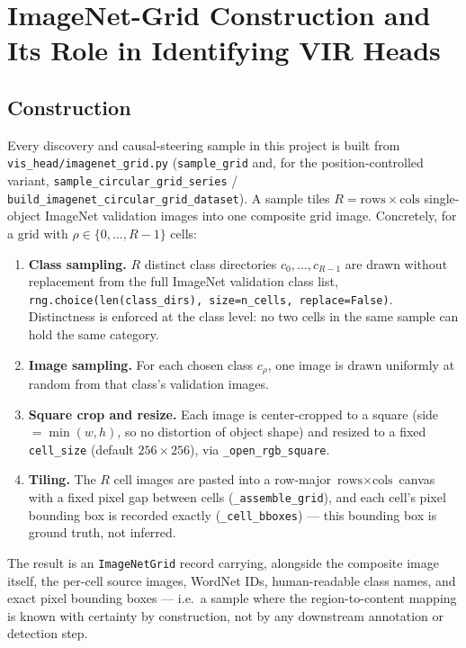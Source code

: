 \section{ImageNet-Grid Construction and Its Role in Identifying VIR Heads}
\label{sec:imagenet-grid}

\subsection{Construction}

Every discovery and causal-steering sample in this project is built from
\texttt{vis\_head/imagenet\_grid.py} (\texttt{sample\_grid} and, for the
position-controlled variant, \texttt{sample\_circular\_grid\_series} /
\texttt{build\_imagenet\_circular\_grid\_dataset}). A sample tiles
$R = \text{rows}\times\text{cols}$ single-object ImageNet validation images
into one composite grid image. Concretely, for a grid with $\rho \in
\{0,\dots,R-1\}$ cells:

\begin{enumerate}
  \item \textbf{Class sampling.} $R$ distinct class directories
  $c_0,\dots,c_{R-1}$ are drawn without replacement from the full ImageNet
  validation class list, \texttt{rng.choice(len(class\_dirs), size=n\_cells,
  replace=False)}. Distinctness is enforced at the class level: no two cells
  in the same sample can hold the same category.
  \item \textbf{Image sampling.} For each chosen class $c_\rho$, one image is
  drawn uniformly at random from that class's validation images.
  \item \textbf{Square crop and resize.} Each image is center-cropped to a
  square (side $=\min(w,h)$, so no distortion of object shape) and resized to
  a fixed \texttt{cell\_size} (default $256\times256$), via
  \texttt{\_open\_rgb\_square}.
  \item \textbf{Tiling.} The $R$ cell images are pasted into a row-major
  $\text{rows}\times\text{cols}$ canvas with a fixed pixel gap between cells
  (\texttt{\_assemble\_grid}), and each cell's pixel bounding box is recorded
  exactly (\texttt{\_cell\_bboxes}) — this bounding box is ground truth, not
  inferred.
\end{enumerate}

The result is an \texttt{ImageNetGrid} record carrying, alongside the
composite image itself, the per-cell source images, WordNet IDs, human-readable
class names, and exact pixel bounding boxes — i.e.\ a sample where the
region-to-content mapping is known with certainty by construction, not by any
downstream annotation or detection step.

